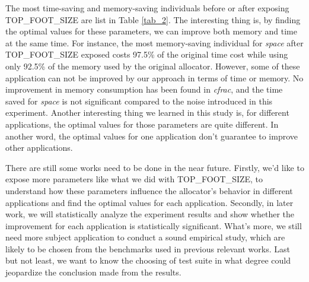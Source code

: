The most time-saving and memory-saving individuals before or after exposing TOP\_FOOT\_SIZE are list in Table \ref{tab_2}. The interesting thing is, by finding the optimal values for these parameters, we can improve both memory and time at the same time. For instance, the most memory-saving individual for \emph{space} after TOP\_FOOT\_SIZE exposed costs 97.5\% of the original time cost while using only 92.5\% of the memory used by the original allocator. However, some of these application can not be improved by our approach in terms of time or memory. No improvement in memory consumption has been found in \emph{cfrac}, and the time saved for \emph{space} is not significant compared to the noise introduced in this experiment. Another interesting thing we learned in this study is, for different applications, the optimal values for those parameters are quite different. In another word, the optimal values for one application don't guarantee to improve other applications.

There are still some works need to be done in the near future. Firstly, we'd like to expose more parameters like what we did with TOP\_FOOT\_SIZE, to understand how these parameters influence the allocator's behavior in different applications and find the optimal values for each application. Secondly, in later work, we will statistically analyze the experiment results and show whether the improvement for each application is statistically significant. What's more, we still need more subject application to conduct a sound empirical study, which are likely to be chosen from the benchmarks used in previous relevant works. Last but not least, we want to know the choosing of test suite in what degree could jeopardize the conclusion made from the results.
